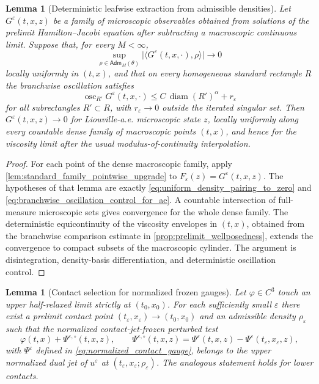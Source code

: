 \documentclass[12pt, letterpaper]{amsart}
\DeclareMathOperator{\diam}{diam}
\DeclareMathOperator{\osc}{osc}
\newcommand{\Adm}{\mathsf{Adm}}
\theoremstyle{plain}
\newtheorem{lemma}[theorem]{Lemma}
\theoremstyle{definition}
\theoremstyle{remark}
\begin{document}
\begin{lemma}[Deterministic leafwise extraction from admissible densities]
\label{lem:leafwise_ae_extraction}
Let $G^\varepsilon(t,x,z)$ be a family of microscopic observables obtained from
solutions of the prelimit Hamilton--Jacobi equation after subtracting a
macroscopic continuous limit.  Suppose that, for every $M<\infty$,
\begin{equation}
\label{eq:uniform_density_pairing_to_zero}
    \sup_{\rho\in\Adm_M(\theta)}
    \big|\langle G^\varepsilon(t,x,\cdot),\rho\rangle\big|\longrightarrow0
\end{equation}
locally uniformly in $(t,x)$, and that on every homogeneous standard rectangle
$R$ the branchwise oscillation satisfies
\begin{equation}
\label{eq:branchwise_oscillation_control_for_ae}
    \osc_{R'}G^\varepsilon(t,x,\cdot)
    \le C\,\diam(R')^\alpha+r_\varepsilon
\end{equation}
for all subrectangles $R'\subset R$, with $r_\varepsilon\to0$ outside the
iterated singular set.  Then $G^\varepsilon(t,x,z)\to0$ for Liouville-a.e.
microscopic state $z$, locally uniformly along every countable dense family of
macroscopic points $(t,x)$, and hence for the viscosity limit after the usual
modulus-of-continuity interpolation.
\end{lemma}

\begin{proof}
For each point of the dense macroscopic family, apply
\cref{lem:standard_family_pointwise_upgrade} to
$F_\varepsilon(z)=G^\varepsilon(t,x,z)$.  The hypotheses of that lemma are
exactly \eqref{eq:uniform_density_pairing_to_zero} and
\eqref{eq:branchwise_oscillation_control_for_ae}.  A countable intersection of
full-measure microscopic sets gives convergence for the whole dense family.
The deterministic equicontinuity of the viscosity envelopes in $(t,x)$, obtained
from the branchwise comparison estimate in \cref{prop:prelimit_wellposedness},
extends the convergence to compact subsets of the macroscopic cylinder.  The
argument is disintegration, density-basis differentiation, and deterministic
oscillation control.
\end{proof}


\begin{lemma}[Contact selection for normalized frozen gauges]
\label{lem:contact_selection_frozen_gauges}
Let $\varphi\in C^3$ touch an upper half-relaxed limit strictly at
$(t_0,x_0)$.  For each sufficiently small $\varepsilon$ there exist a prelimit
contact point $(t_\varepsilon,x_\varepsilon)\to(t_0,x_0)$ and an admissible
density $\rho_\varepsilon$ such that the normalized contact-jet-frozen perturbed
test
\begin{equation}
    \varphi(t,x)+\Psi^{\varepsilon,\circ}(t,x,z),
    \qquad
    \Psi^{\varepsilon,\circ}(t,x,z)
    =\Psi^\varepsilon(t,x,z)-\Psi^\varepsilon(t_\varepsilon,x_\varepsilon,z),
\end{equation}
with $\Psi^\varepsilon$ defined in \eqref{eq:normalized_contact_gauge}, belongs
to the upper normalized dual jet of $u^\varepsilon$ at
$(t_\varepsilon,x_\varepsilon;\rho_\varepsilon)$.  The analogous statement holds
for lower contacts.
\end{lemma}
\end{document}
